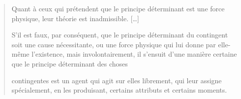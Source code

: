 \begin{quote}
Quant à ceux qui prétendent que le principe déterminant est une force
physique, leur théorie
est inadmissible. {[}\ldots{]}

S'il est faux, par conséquent, que le principe déterminant du contingent
soit une cause nécessitante, ou une force physique qui lui donne par
elle-même l'existence, mais involontairement, il s'ensuit d'une manière
certaine que le principe déterminant des choses

contingentes est un agent qui agit sur elles librement, qui leur assigne
spécialement, en les produisant, certains attributs et certains moments.
\end{quote}
